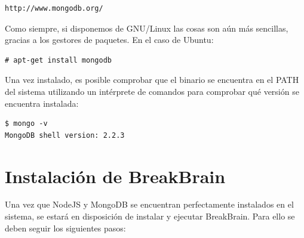 \begin{verbatim}
http://www.mongodb.org/
\end{verbatim}

Como siempre, si disponemos de GNU/Linux las cosas son aún más sencillas, gracias a los gestores de paquetes. En el caso de Ubuntu:

\begin{verbatim}
# apt-get install mongodb
\end{verbatim}

Una vez instalado, es posible comprobar que el binario se encuentra en el PATH del sistema utilizando un intérprete de comandos para comprobar qué versión se encuentra instalada:

\begin{verbatim}
$ mongo -v
MongoDB shell version: 2.2.3
\end{verbatim}

\section{Instalación de BreakBrain}

Una vez que NodeJS y MongoDB se encuentran perfectamente instalados en el sistema, se estará en disposición de instalar y ejecutar BreakBrain. Para ello se deben seguir los siguientes pasos:

